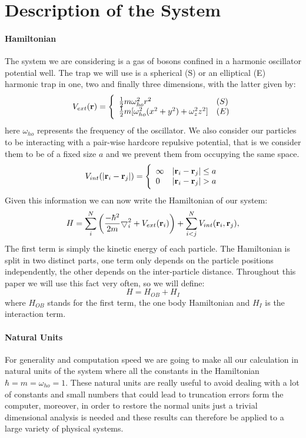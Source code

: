 \documentclass[10pt,a4paper,titlepage]{article}
\begin{document}
\section*{Description of the System}
\paragraph*{Hamiltonian} The system we are considering is a gas of bosons confined in a harmonic oscillator potential well. The trap we will use is a spherical (S)
 or an elliptical (E) harmonic trap in one, two and finally three
 dimensions, with the latter given by:
  \begin{equation}
 V_{ext}({\bf r}) = 
 \Bigg\{
 \begin{array}{ll}
	 \frac{1}{2}m\omega_{ho}^2r^2 & (S)\\
 \strut
	 \frac{1}{2}m[\omega_{ho}^2(x^2+y^2) + \omega_z^2z^2] & (E)
 \label{trap_eqn}
 \end{array}
 \end{equation}
 here $\omega_{ho}$ represents the frequency of the oscillator. We also consider our particles to be interacting with a pair-wise hardcore repulsive potential, that is we consider them to be of a fixed size $a$ and we prevent them from occupying the same space. 
  \begin{equation}
 V_{int}(|{\bf r}_i-{\bf r}_j|) =  \Bigg\{
 \begin{array}{ll}
	 \infty & {|{\bf r}_i-{\bf r}_j|} \leq {a}\\
	 0 & {|{\bf r}_i-{\bf r}_j|} > {a}
 \end{array}
 \end{equation}
Given this information we can now write the Hamiltonian of our system:
 \begin{equation}
     H = \sum_i^N \left(
	 \frac{-\hbar^2}{2m}
	 { \bigtriangledown }_{i}^2 +
	 V_{ext}({\bf{r}}_i)\right)  +
	 \sum_{i<j}^{N} V_{int}({\bf{r}}_i,{\bf{r}}_j),
 \end{equation}
The first term is simply the kinetic energy of each particle. The Hamiltonian is split in two distinct parts, one term only depends on the particle positions independently, the other depends on the inter-particle distance. Throughout this paper we will use this fact very often, so we will define:
 \begin{equation}
H = H_{OB} + H_{I}
 \end{equation}
where $H_{OB}$ stands for the first term, the one body Hamiltonian and $H_{I}$ is the interaction term. 
\paragraph{Natural Units}
For generality and computation speed we are going to make all our calculation in natural units of the system where all the constants in the Hamiltonian $\hbar = m = \omega_{ho} = 1$. These natural units are really useful to avoid dealing with a lot of constants and small numbers that could lead to truncation errors form the computer, moreover, in order to restore the normal units just a trivial dimensional analysis is needed and these results can therefore be applied to a large variety of physical systems. 
\end{document}
